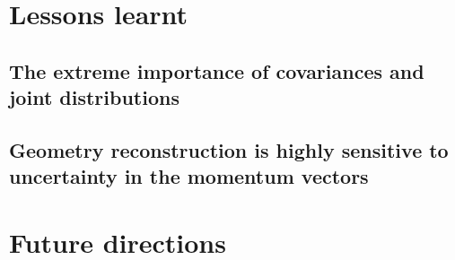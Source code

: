 \section{Lessons learnt}
\subsection{The extreme importance of covariances and joint distributions}
\subsection{Geometry reconstruction is highly sensitive to uncertainty in the momentum vectors}

\section{Future directions}